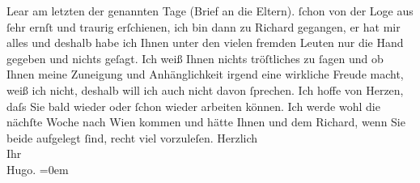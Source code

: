 \begin{ledgroupsized}[t]{13cm}
{{{{                     Lear} am letzten der genannten Tage (Brief an die Eltern).}}}\label{K_L00728_1h} ſchon von der Loge aus ſehr ernſt und
               traurig erſchienen, ich bin dann zu Richard
               gegangen, er hat mir alles \label{K_L00728_2v}\label{K_L00728_2h} und deshalb habe ich Ihnen
               unter den vielen fremden Leuten nur die Hand gegeben und nichts geſagt. Ich weiß
               Ihnen {\pb}nichts tröſtliches zu ſagen
               und ob Ihnen meine Zuneigung und Anhänglichkeit irgend eine wirkliche Freude macht,
               weiß ich nicht, deshalb will ich auch nicht davon ſprechen. Ich hoffe von Herzen,
               daſs Sie bald wieder oder ſchon wieder arbeiten können. Ich werde {\pb}wohl die nächſte Woche nach Wien kommen und hätte Ihnen und dem Richard, wenn Sie beide aufgelegt ſind, recht viel
               vorzuleſen.\pend
           \pstart
           Herzlich{\\[\baselineskip]}Ihr{\\[\baselineskip]}\spacefill\mbox{Hugo.}\pend
           \leftskip=0em{}
         
         \endnumbering{}\end{ledgroupsized}  \newcommand{\dateiname}{L00728}\newcommand{\titel}{Hugo von Hofmannsthal an Arthur Schnitzler, 3. 10. [1897]}\newcommand{\editorInnen}{Martin Anton Müller und Gerd-Hermann Susen}
      